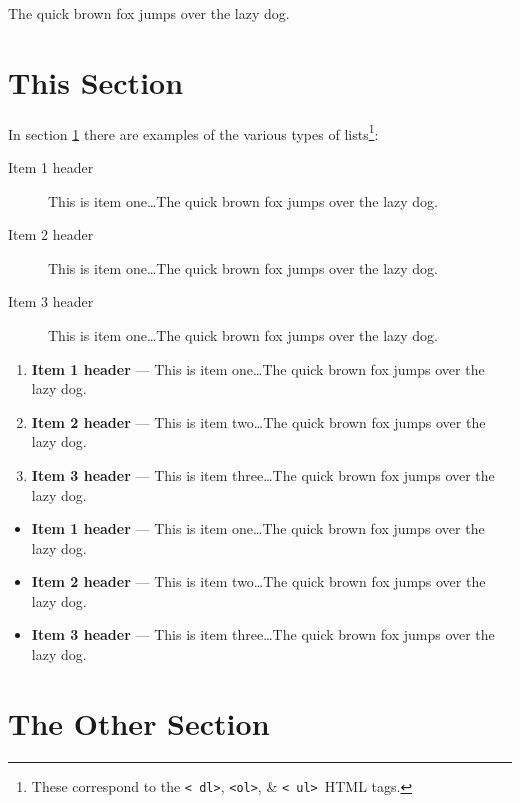 \documentclass[11pt]{article}%
\begin{document}
\begin{multicols*}{2}
The quick brown fox
jumps over the lazy
dog. \lipsum[2]

\section{This Section}
\label{This Section}

In section \ref{This Section} there are examples of the various
types of lists\footnote{These correspond to the {\tt \textless
dl\textgreater}, {\tt \textless ol\textgreater}, \& {\tt \textless
ul\textgreater}\ HTML tags.}:

\begin{description}
\item[Item 1 header] This is item one\dots The quick brown fox jumps
over the lazy dog.
\item[Item 2 header] This is item one\dots The quick brown fox jumps
over the lazy dog.
\item[Item 3 header] This is item one\dots The quick brown fox jumps
over the lazy dog.
\end{description}

\begin{enumerate}
\item {\bf Item 1 header} --- This is item one\dots The quick brown fox jumps
over the lazy dog.
\item {\bf Item 2 header} --- This is item two\dots The quick brown fox jumps
over the lazy dog.
\item {\bf Item 3 header} --- This is item three\dots The quick brown fox jumps
over the lazy dog.
\end{enumerate}

\begin{itemize}
\item {\bf Item 1 header} --- This is item one\dots The quick brown fox jumps
over the lazy dog.
\item {\bf Item 2 header} --- This is item two\dots The quick brown fox jumps
over the lazy dog.
\item {\bf Item 3 header} --- This is item three\dots The quick brown fox jumps
over the lazy dog.
\end{itemize}

\section{The Other Section}
\label{The Other Section}


\end{multicols*}
\end{document}
